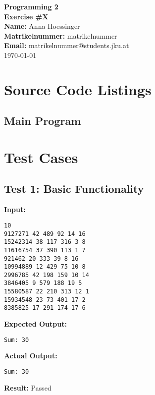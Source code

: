 \documentclass[a4paper,12pt]{article}
\makeatletter
\newcommand{\courseTitle}{Programming 2}
\newcommand{\exerciseNumber}{X} %
\newcommand{\studentName}{Anna Hoessinger}
\newcommand{\matrikelnummer}{matrikelnummer}
\newcommand{\email}{matrikelnummer@students.jku.at}
\makeatother
\begin{document}
\begin{titlepage}
    \centering
    \vspace*{\fill}
    {\Huge \textbf{\courseTitle}}\\[1.5cm]
    {\LARGE \textbf{Exercise \#\exerciseNumber}}\\[2cm]
    \textbf{Name:} \studentName \\[0.5cm]
    \textbf{Matrikelnummer:} \matrikelnummer \\[0.5cm]
    \textbf{Email:} \email \\[1.5cm]
    \vspace*{\fill}
    {\small \today}
\end{titlepage}

\pagestyle{fancy}

\section{Source Code Listings}

\subsection{Main Program}
%

\section{Test Cases}

\subsection{Test 1: Basic Functionality}
\textbf{Input:}
\begin{verbatim}
10
9127271 42 489 92 14 16
15242314 38 117 316 3 8
11616754 37 390 113 1 7
921462 20 333 39 8 16
10994889 12 429 75 10 8
2996785 42 198 159 10 14
3846405 9 579 188 19 5
15580587 22 210 313 12 1
15934548 23 73 401 17 2
8385825 17 291 174 17 6
\end{verbatim}

\textbf{Expected Output:}
\begin{verbatim}
Sum: 30
\end{verbatim}

\textbf{Actual Output:}
\begin{verbatim}
Sum: 30
\end{verbatim}

\textbf{Result:} Passed
\end{document}
